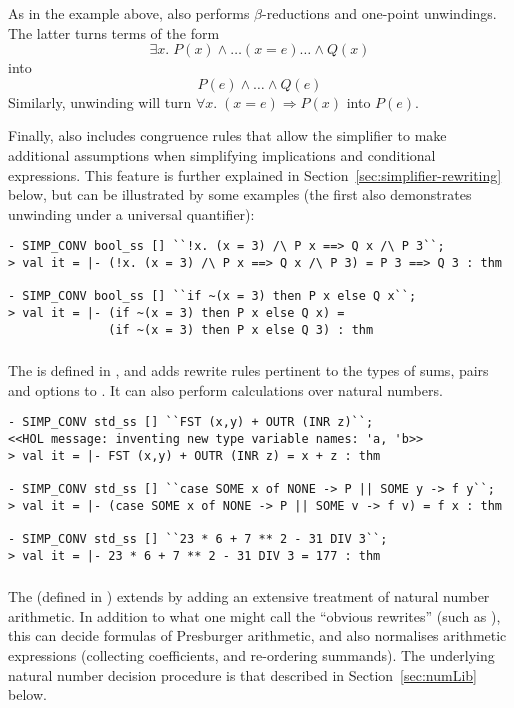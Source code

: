 As in the example above,  also performs
$\beta$-reductions and one-point unwindings.  The latter turns terms
of the form \[
\exists x.\;P(x)\land\dots (x = e) \dots\land Q(x)
\]
into
\[
P(e) \land \dots \land Q(e)
\]
Similarly, unwinding will turn $\forall x.\;(x = e)
\Rightarrow P(x)$ into $P(e)$.

Finally,  also includes congruence rules that allow
the simplifier to make additional assumptions when simplifying
implications and conditional expressions.  This feature is further
explained in Section~\ref{sec:simplifier-rewriting} below, but can be
illustrated by some examples (the first also demonstrates unwinding
under a universal quantifier):
\begin{session}
\begin{verbatim}
- SIMP_CONV bool_ss [] ``!x. (x = 3) /\ P x ==> Q x /\ P 3``;
> val it = |- (!x. (x = 3) /\ P x ==> Q x /\ P 3) = P 3 ==> Q 3 : thm

- SIMP_CONV bool_ss [] ``if ~(x = 3) then P x else Q x``;
> val it = |- (if ~(x = 3) then P x else Q x) =
              (if ~(x = 3) then P x else Q 3) : thm
\end{verbatim}
\end{session}

\subsubsection{}
%
%
The  \simpset{} is defined in , and adds
rewrite rules pertinent to the types of sums, pairs and options to
.  It can also perform calculations over natural numbers.
\begin{session}
\begin{verbatim}
- SIMP_CONV std_ss [] ``FST (x,y) + OUTR (INR z)``;
<<HOL message: inventing new type variable names: 'a, 'b>>
> val it = |- FST (x,y) + OUTR (INR z) = x + z : thm

- SIMP_CONV std_ss [] ``case SOME x of NONE -> P || SOME y -> f y``;
> val it = |- (case SOME x of NONE -> P || SOME v -> f v) = f x : thm

- SIMP_CONV std_ss [] ``23 * 6 + 7 ** 2 - 31 DIV 3``;
> val it = |- 23 * 6 + 7 ** 2 - 31 DIV 3 = 177 : thm
\end{verbatim}
\end{session}

\subsubsection{}
%
%
The  \simpset{} (defined in ) extends
 by adding an extensive treatment of natural number
arithmetic.  In addition to what one might call the ``obvious
rewrites'' (such as ), this \simpset{} can
decide formulas of Presburger arithmetic, and also normalises
arithmetic expressions (collecting coefficients, and re-ordering
summands).  The underlying natural number decision procedure is that
described in Section~\ref{sec:numLib} below.

